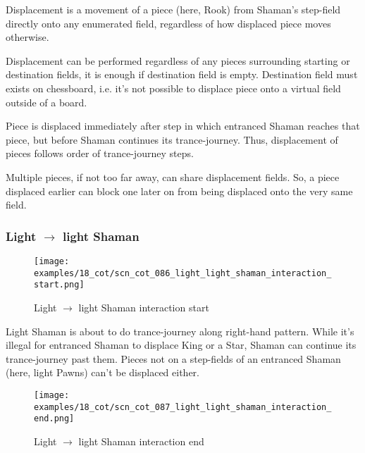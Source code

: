 Displacement is a movement of a piece (here, Rook) from Shaman's step-field directly
onto any enumerated field, regardless of how displaced piece moves otherwise.

Displacement can be performed regardless of any pieces surrounding starting or
destination fields, it is enough if destination field is empty. Destination field
must exists on chessboard, i.e. it's not possible to displace piece onto a virtual
field outside of a board.

Piece is displaced immediately after step in which entranced Shaman reaches that
piece, but before Shaman continues its trance-journey. Thus, displacement of pieces
follows order of trance-journey steps.

Multiple pieces, if not too far away, can share displacement fields. So, a piece
displaced earlier can block one later on from being displaced onto the very same
field.

\clearpage %

\subsubsection*{Light $\rightarrow$ light Shaman}
\label{sec:Conquest of Tlalocan/Trance-journey/Interactions/Light --> light Shaman}

\vspace*{-1.2\baselineskip}
\noindent
\begin{figure}[!h]
\texttt{[image: examples/18\_cot/scn\_cot\_086\_light\_light\_shaman\_interaction\_start.png]}
\caption{Light $\rightarrow$ light Shaman interaction start}
\label{fig:scn_cot_086_light_light_shaman_interaction_start}
\end{figure}

Light Shaman is about to do trance-journey along right-hand pattern. While it's
illegal for entranced Shaman to displace King or a Star, Shaman can continue its
trance-journey past them. Pieces not on a step-fields of an entranced Shaman (here,
light Pawns) can't be displaced either.

\clearpage %

\noindent
\begin{figure}[!h]
\texttt{[image: examples/18\_cot/scn\_cot\_087\_light\_light\_shaman\_interaction\_end.png]}
\caption{Light $\rightarrow$ light Shaman interaction end}
\label{fig:scn_cot_087_light_light_shaman_interaction_end}
\end{figure}

